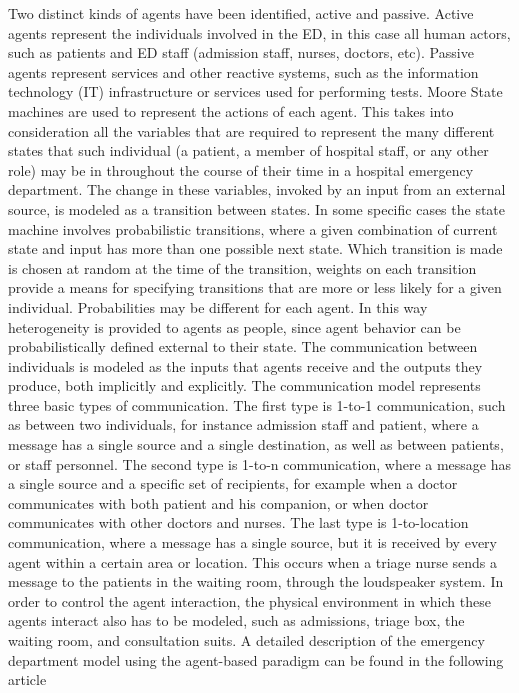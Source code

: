 \documentclass[11pt]{article} %
\begin{document}
Two distinct kinds of agents have been identified, active and passive. Active agents represent the individuals involved in the ED, in this case all human actors, such as patients and ED staff (admission staff, nurses, doctors, etc). Passive agents represent services and other reactive systems, such as the information technology (IT) infrastructure or services used for performing tests. Moore State machines are used to represent the actions of each agent. This takes into consideration all the variables that are required to represent the many different states that such individual (a patient, a member of hospital staff, or any other role) may be in throughout the course of their time in a hospital emergency department. The change in these variables, invoked by an input from an external source, is modeled as a transition between states. In some specific cases the state machine involves probabilistic transitions, where a given combination of current state and input has more than one possible next state. Which transition is made is chosen at random at the time of the transition, weights on each transition provide a means for specifying transitions that are more or less likely for a given individual. Probabilities may be different for each agent. In this way heterogeneity is provided to agents as people, since agent behavior can be probabilistically defined external to their state. The communication between individuals is modeled as the inputs that agents receive and the outputs they produce, both implicitly and explicitly. The communication model represents three basic types of communication. The first type is 1-to-1 communication, such as between two individuals, for instance admission staff and patient, where a message has a single source and a single destination, as well as between patients, or staff personnel. The second type is 1-to-n communication, where a message has a single source and a specific set of recipients, for example when a doctor communicates with both patient and his companion, or when doctor communicates with other doctors and nurses. The last type is 1-to-location communication, where a message has a single source, but it is received by every agent within a certain area or location. This occurs when a triage nurse sends a message to the patients in the waiting room, through the loudspeaker system. In order to control the agent interaction, the physical environment in which these agents interact also has to be modeled, such as admissions, triage box, the waiting room, and consultation suits. A detailed description of the emergency department model using the agent-based paradigm can be found in the following article \cite{Manel:2011p1870}
\end{document}
